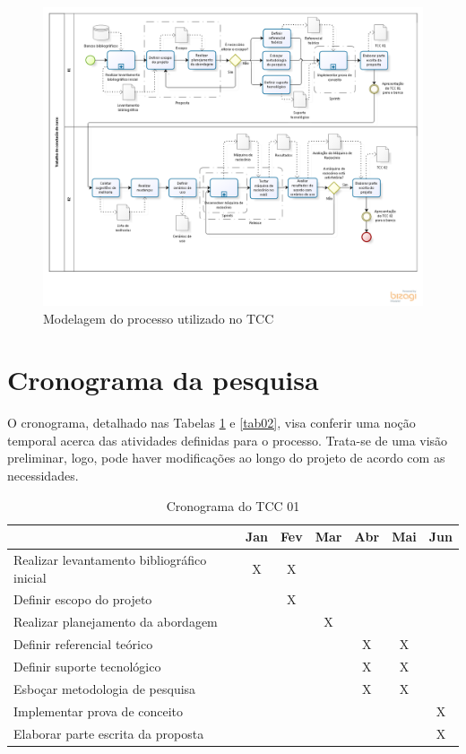 \FloatBarrier
\begin{figure}[!h]
\centering
\includegraphics[keepaspectratio=true,scale=0.5]{figuras/modelagemTcc.png}
\caption{Modelagem do processo utilizado no TCC}
\label{modelagem}
\end{figure}
\clearpage
 
\section{Cronograma da pesquisa}
O cronograma, detalhado nas Tabelas \ref{tab01} e \ref{tab02}, visa conferir uma noção temporal acerca das atividades definidas para o processo. Trata-se de uma visão preliminar, logo, pode haver modificações ao longo do projeto de acordo com as necessidades.      

\FloatBarrier
\begin{table}[h]
	\centering
	
	\begin{tabular}{lcccccc}
		\toprule
		& \textbf{Jan} & \textbf{Fev} & \textbf{Mar} & \textbf{Abr} & \textbf{Mai} & 		
		\textbf{Jun} \\
		\midrule
		Realizar levantamento bibliográfico inicial & X & X &  &  &  &  \\
		\midrule
		Definir escopo do projeto &  & X &  &  &  &  \\
		\midrule
		Realizar planejamento da abordagem &  &  & X &  &  &  \\
		\midrule
		Definir referencial teórico &  &  &  & X & X &  \\
		\midrule
		Definir suporte tecnológico &  &  &  & X & X &  \\
		\midrule
		Esboçar metodologia de pesquisa &  &  &  & X & X &  \\
		\midrule
		Implementar prova de conceito &  &  &  &  &  & X \\
		\midrule
		Elaborar parte escrita da proposta &  &  &  &  &  & X \\
		\bottomrule
	\end{tabular}

	\caption{Cronograma do TCC 01}
	\label{tab01}
\end{table}


